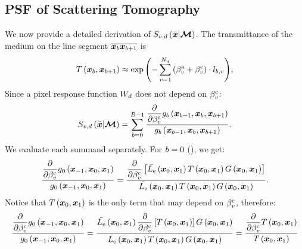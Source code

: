 \documentclass{article}
\begin{document}
\subsection{\ac{PSF} of Scattering Tomography}
\label{sec:psf_st}
We now provide a detailed derivation of $S_{v, d}\left({\Bar{\boldsymbol{x}}|\boldsymbol{\mathcal{M}}}\right)$. The transmittance of the medium on the line segment $\overline{{\boldsymbol{x}_{b}}{\boldsymbol{x}_{b+1}}}$ is
\begin{equation}
    T\left({{\boldsymbol{x}_{b}},{\boldsymbol{x}_{b+1}}}\right) \approx \exp{\left({-\sum_{v=1}^{N_{\text{u}}}{\left({\beta^{\text{a}}_{v}+\beta^{\text{c}}_{v}}\right)\cdot l_{b,v}}}\right)},
\end{equation}
Since a pixel response function $W_{d}$ does not depend on $\beta^{\text{c}}_{v}$:
\begin{equation}
S_{v, d}\left({\Bar{\boldsymbol{x}}|\boldsymbol{\mathcal{M}}}\right) = \sum_{b=0}^{B-1}{\frac{\dfrac{\partial}{\partial {\beta^{\text{c}}_{v}}}g_{b}\left({\boldsymbol{x}_{b-1}, \boldsymbol{x}_{b}, \boldsymbol{x}_{b+1}}\right)}{g_{b}\left({\boldsymbol{x}_{b-1}, \boldsymbol{x}_{b}, \boldsymbol{x}_{b+1}}\right)}}.
\end{equation}
We evaluate each summand separately. For $b=0$ (\eqnopar{\ref{eq:g0K}}), we get:
\begin{equation}
\frac{\dfrac{\partial}{\partial {\beta^{\text{c}}_v}}g_{0}\left({\boldsymbol{x}_{-1},\boldsymbol{x}_{0},\boldsymbol{x}_{1}}\right)}{g_{0}\left({\boldsymbol{x}_{-1},\boldsymbol{x}_{0},\boldsymbol{x}_{1}}\right)} = \frac{\dfrac{\partial}{\partial {\beta^{\text{c}}_{v}}}\left[{\Bar{L_{\text{e}}}\left({\boldsymbol{x}_{0},\boldsymbol{x}_{1}}\right)T\left({{\boldsymbol{x}_{0}},{\boldsymbol{x}_{1}}}\right)G\left({\boldsymbol{x}_0,\boldsymbol{x}_{1}}\right)}\right]}{\Bar{L_{\text{e}}}\left({\boldsymbol{x}_{0},\boldsymbol{x}_{1}}\right)T\left({{\boldsymbol{x}_{0}},{\boldsymbol{x}_{1}}}\right)G\left({\boldsymbol{x}_0,\boldsymbol{x}_{1}}\right)}.
\end{equation}
Notice that $T\left({{\boldsymbol{x}_{0}},{\boldsymbol{x}_{1}}}\right)$ is the only term that may depend on $\beta^{\text{c}}_{v}$, therefore:
\begin{equation}
\label{eq:Sm0}
\frac{\dfrac{\partial}{\partial {\beta^{\text{c}}_v}}g_{0}\left({\boldsymbol{x}_{-1},\boldsymbol{x}_{0},\boldsymbol{x}_{1}}\right)}{g_{0}\left({\boldsymbol{x}_{-1},\boldsymbol{x}_{0},\boldsymbol{x}_{1}}\right)} = \frac{\Bar{L_{\text{e}}}\left({\boldsymbol{x}_{0},\boldsymbol{x}_{1}}\right)\dfrac{\partial}{\partial {\beta^{\text{c}}_{v}}}\left[{T\left({{\boldsymbol{x}_{0}},{\boldsymbol{x}_{1}}}\right)}\right]G\left({\boldsymbol{x}_0,\boldsymbol{x}_{1}}\right)}{\Bar{L_{\text{e}}}\left({\boldsymbol{x}_{0},\boldsymbol{x}_{1}}\right)T\left({{\boldsymbol{x}_{0}},{\boldsymbol{x}_{1}}}\right)G\left({\boldsymbol{x}_0,\boldsymbol{x}_{1}}\right)} = \frac{\dfrac{\partial}{\partial {\beta^{\text{c}}_v}}T\left({{\boldsymbol{x}_{0}},{\boldsymbol{x}_{1}}}\right)}{T\left({{\boldsymbol{x}_{0}},{\boldsymbol{x}_{1}}}\right)}
\end{equation}
\end{document}
